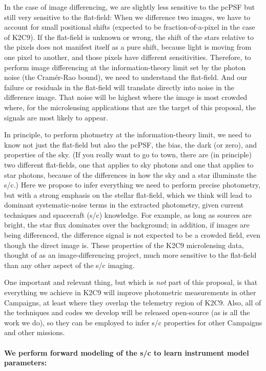\documentclass[12pt,preprint]{aastex}
\begin{document}
In the case of image differencing, we are slightly less sensitive to the
pcPSF but still very sensitive to the flat-field:
When we difference two images, we have to account for small positional
shifts (expected to be fraction-of-a-pixel in the case of K2C9).
If the flat-field is unknown or wrong, the shift of the stars relative
to the pixels does not manifest itself as a pure shift, because light
is moving from one pixel to another, and those pixels have different
sensitivities.
Therefore, to perform image differencing at the information-theory
limit set by the photon noise (the Cram\'er-Rao bound), we need to
understand the flat-field.
And our failure or residuals in the flat-field will translate directly
into noise in the difference image.
That noise will be highest where the image is most crowded where, for
the microlensing applications that are the target of this proposal,
the signals are most likely to appear.

In principle, to perform photmetry at the information-theory limit,
we need to know not just the flat-field but also the pcPSF, the bias,
the dark (or zero), and properties of the sky.
(If you really want to go to town, there are (in principle) two different
flat-fields, one that applies to sky photons and one that applies to star photons,
because of the differences in how the sky and a star illuminate the
s/c.)
Here we propose to infer everything we need to perform precise
photometry, but with a strong emphasis on the stellar flat-field, which we
think will lead to dominant systematic-noise terms in the extracted
photometry, given current techniques and spacecraft (s/c) knowledge.
For example, as long as sources are bright, the star flux dominates
over the background; in addition, if images are being differenced, the
difference signal is not expected to be a crowded field, even though
the direct image is.
These properties of the K2C9 microlensing data, thought of as an
image-differencing project, much more sensitive to the flat-field than
any other aspect of the s/c imaging.

One important and relevant thing, but which is \emph{not} part of this
proposal, is that everything we achieve in K2C9 will improve photometric
measurements in other Campaigns, at least where they overlap the
telemetry region of K2C9.
Also, all of the techniques and codes we develop will be released
open-source (as is all the work we do), so they can be employed to
infer s/c properties for other Campaigns and other missions.

\paragraph{We perform forward modeling of the s/c to learn instrument model parameters:}
\end{document}

